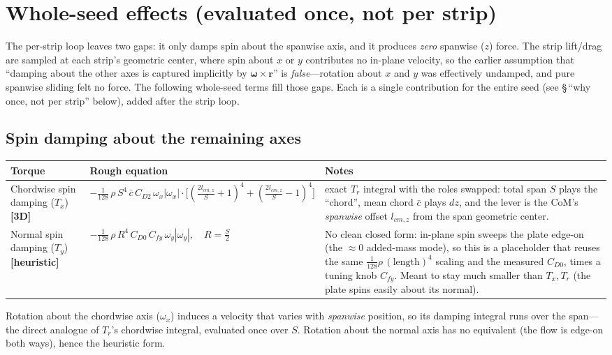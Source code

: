 \documentclass[11pt]{article}
\newcommand{\newin}{{\small\textbf{\color{blue}[3D]}}}          %
\newcommand{\heur}{{\small\textbf{\color{teal}[heuristic]}}}     %
\begin{document}
\section*{Whole-seed effects (evaluated once, not per strip)}
The per-strip loop leaves two gaps: it only damps spin about the spanwise axis, and it
produces \emph{zero} spanwise ($z$) force. The strip lift/drag are sampled at each
strip's geometric center, where spin about $x$ or $y$ contributes no in-plane velocity,
so the earlier assumption that ``damping about the other axes is captured implicitly by
$\boldsymbol\omega\times\mathbf r$'' is \emph{false}---rotation about $x$ and $y$ was
effectively undamped, and pure spanwise sliding felt no force. The following whole-seed
terms fill those gaps. Each is a single contribution for the entire seed (see
\S\,``why once, not per strip'' below), added after the strip loop.

\subsection*{Spin damping about the remaining axes}
\begin{tabularx}{\textwidth}{@{} l >{\raggedright\arraybackslash}p{} L @{}}
\toprule
\textbf{Torque} & \textbf{Rough equation} & \textbf{Notes} \\
\midrule
Chordwise spin damping ($T_x$) \newin{} &
$-\tfrac{1}{128}\,\rho\,S^4\,\bar c\,C_{D2}\,\omega_x|\omega_x|\cdot\big[(\tfrac{2l_{cm,z}}{S}{+}1)^4{+}(\tfrac{2l_{cm,z}}{S}{-}1)^4\big]$ &
exact $T_r$ integral with the roles swapped: total span $S$ plays the ``chord'', mean
chord $\bar c$ plays $dz$, and the lever is the CoM's \emph{spanwise} offset $l_{cm,z}$
from the span geometric center. \\

Normal spin damping ($T_y$) \heur{} &
$-\tfrac{1}{128}\,\rho\,R^4\,C_{D0}\,C_{fy}\,\omega_y|\omega_y|,\quad R=\tfrac{S}{2}$ &
No clean closed form: in-plane spin sweeps the plate edge-on (the $\approx 0$ added-mass
mode), so this is a placeholder that reuses the same $\tfrac{1}{128}\rho\,(\text{length})^4$
scaling and the measured $C_{D0}$, times a tuning knob $C_{fy}$. Meant to stay much
smaller than $T_x,T_r$ (the plate spins easily about its normal). \\
\bottomrule
\end{tabularx}

\medskip
\noindent Rotation about the chordwise axis ($\omega_x$) induces a velocity that varies
with \emph{spanwise} position, so its damping integral runs over the span---the direct
analogue of $T_r$'s chordwise integral, evaluated once over $S$. Rotation about the
normal axis has no equivalent (the flow is edge-on both ways), hence the heuristic form.
\end{document}

